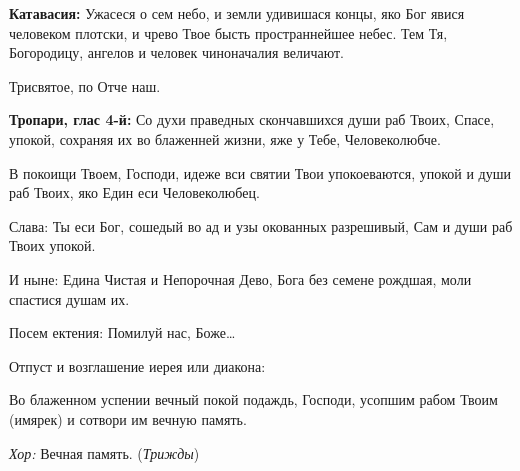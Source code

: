 \begin{mymulticols}
{\bfseries Катавасия:} Ужасеся о сем небо, и земли удивишася концы, яко Бог явися человеком плотски, и чрево Твое бысть пространнейшее небес. Тем Тя, Богородицу, ангелов и человек чиноначалия величают. 

Трисвятое, по Отче наш. 

{\bfseries Тропари, глас 4-й:} Со духи праведных скончавшихся души раб Твоих, Спасе, упокой, сохраняя их во блаженней жизни, яже у Тебе, Человеколюбче. 

В покоищи Твоем, Господи, идеже вси святии Твои упокоеваются, упокой и души раб Твоих, яко Един еси Человеколюбец. 

Слава: Ты еси Бог, сошедый во ад и узы окованных разрешивый, Сам и души раб Твоих упокой. 

И ныне: Едина Чистая и Непорочная Дево, Бога без семене рождшая, моли спастися душам их. 

Посем ектения: Помилуй нас, Боже… 

Отпуст и возглашение иерея или диакона: 

Во блаженном успении вечный покой подаждь, Господи, усопшим рабом Твоим (имярек) и сотвори им вечную память. 

{\itshape Хор:} Вечная память. ({\itshape Трижды})

\end{mymulticols}

\mychapterending


